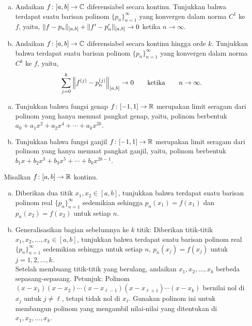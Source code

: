 \begin{exercise}
\pagebreak[2]
\leavevmode
\begin{enumerate}[a)]
\item
Andaikan $f \colon [a,b] \to {\mathbb{C}}$ diferensiabel secara kontinu.
Tunjukkan bahwa terdapat suatu barisan polinom
$\{ p_n \}_{n=1}^\infty$
yang konvergen dalam norma $C^1$ ke $f$, yaitu,
$\lVert {f - p_n} \rVert_{[a,b]} + \lVert {f'-p_n'} \rVert_{[a,b]} \to 0$ ketika $n \to \infty$.
\item
Andaikan $f \colon [a,b] \to {\mathbb{C}}$ diferensiabel secara kontinu hingga orde $k$.
Tunjukkan bahwa terdapat suatu barisan polinom
$\{ p_n \}_{n=1}^\infty$
yang konvergen dalam norma $C^k$ ke $f$, yaitu,
\begin{equation*}
\sum_{j=0}^k \left\lVert {f^{(j)} - p_n^{(j)}} \right\rVert_{[a,b]} \to 0 \qquad \text{ketika} \qquad
n \to \infty.
\end{equation*}
\end{enumerate}
\end{exercise}

\begin{exercise}
\pagebreak[2]
\leavevmode
\begin{enumerate}[a)]
\item
Tunjukkan bahwa fungsi genap $f \colon [-1,1] \to {\mathbb{R}}$ merupakan limit seragam
dari polinom yang hanya memuat pangkat genap, yaitu, polinom
berbentuk $a_0 + a_1 x^2 + a_2 x^4 + \cdots + a_k x^{2k}$.
\item
Tunjukkan bahwa fungsi ganjil $f \colon [-1,1] \to {\mathbb{R}}$ merupakan limit seragam
dari polinom yang hanya memuat pangkat ganjil, yaitu, polinom
berbentuk $b_1 x + b_2 x^3 + b_3 x^5 + \cdots + b_k x^{2k-1}$.
\end{enumerate}
\end{exercise}

\begin{exercise} \label{exercise:finitelymanyweierequal}
\pagebreak[2]
Misalkan $f \colon [a,b] \to {\mathbb{R}}$ kontinu.
\begin{enumerate}[a)]
\item
Diberikan dua titik $x_1,x_2 \in [a,b]$, tunjukkan bahwa
terdapat suatu barisan polinom real $\{ p_n \}_{n=1}^\infty$
sedemikian sehingga $p_n(x_1) = f(x_1)$ dan $p_n(x_2) = f(x_2)$ untuk setiap $n$.
\item
Generalisasikan bagian sebelumnya ke $k$ titik:
Diberikan titik-titik $x_1,x_2,\ldots,x_k \in [a,b]$, tunjukkan bahwa
terdapat suatu barisan polinom real $\{ p_n \}_{n=1}^\infty$
sedemikian sehingga untuk setiap $n$, $p_n(x_j) = f(x_j)$ untuk $j=1,2,\ldots,k$.
\\
Setelah membuang titik-titik yang berulang, andaikan $x_1,x_2,\ldots,x_k$ berbeda sepasang-sepasang.
Petunjuk: Polinom $(x-x_1)(x-x_2)\cdots(x-x_{\ell-1})(x-x_{\ell+1})
\cdots(x-x_k)$ bernilai nol di $x_j$ untuk $j \neq \ell$, tetapi tidak nol di
$x_\ell$.  Gunakan polinom ini untuk membangun polinom yang mengambil nilai-nilai yang ditentukan
di $x_1,x_2,\ldots,x_k$.
\end{enumerate}
\end{exercise}


